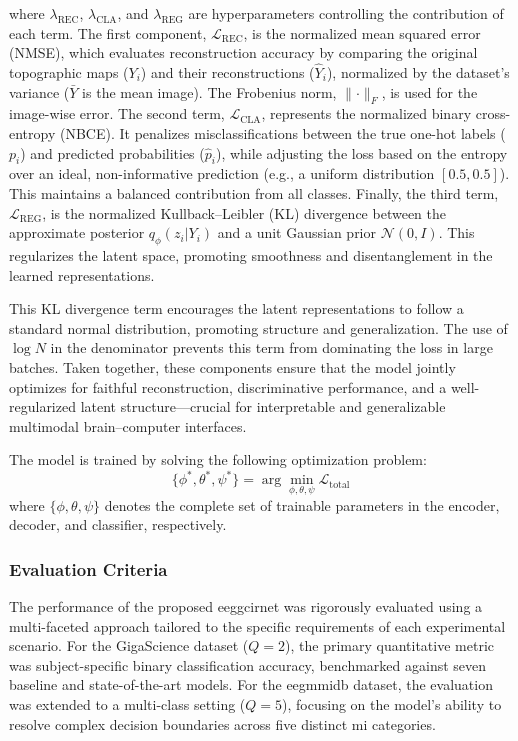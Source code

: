 \noindent
where $\lambda_{\text{REC}}$, $\lambda_{\text{CLA}}$, and $\lambda_{\text{REG}}$ are hyperparameters controlling the contribution of each term.
The first component, $\mathcal{L}_{\text{REC}}$, is the normalized mean squared error (NMSE), which evaluates reconstruction accuracy by comparing the original topographic maps ($Y_i$) and their reconstructions ($\hat{Y}_i$), normalized by the dataset's variance ($\bar{Y}$ is the mean image). The Frobenius norm, $\lVert \cdot \rVert_F$, is used for the image-wise error.
The second term, $\mathcal{L}_{\text{CLA}}$, represents the normalized binary cross-entropy (NBCE). It penalizes misclassifications between the true one-hot labels ($p_i$) and predicted probabilities ($\hat{p}_i$), while adjusting the loss based on the entropy over an ideal, non-informative prediction (e.g., a uniform distribution $[0.5, 0.5]$). This maintains a balanced contribution from all classes.
Finally, the third term, $\mathcal{L}_{\text{REG}}$, is the normalized Kullback–Leibler (KL) divergence between the approximate posterior $q_{\phi}(z_i|Y_i)$ and a unit Gaussian prior $\mathcal{N}(0, I)$. This regularizes the latent space, promoting smoothness and disentanglement in the learned representations.

This KL divergence term encourages the latent representations to follow a standard normal distribution, promoting structure and generalization. The use of $\log N$ in the denominator prevents this term from dominating the loss in large batches. Taken together, these components ensure that the model jointly optimizes for faithful reconstruction, discriminative performance, and a well-regularized latent structure—crucial for interpretable and generalizable multimodal brain–computer interfaces.

The model is trained by solving the following optimization problem:
\[
\{\phi^*, \theta^*, \psi^*\} = \arg\min_{\phi, \theta, \psi} \mathcal{L}_{\text{total}}
\]
where $\{\phi, \theta, \psi\}$ denotes the complete set of trainable parameters in the encoder, decoder, and classifier, respectively.



\subsubsection{Evaluation Criteria}

The performance of the proposed \gls{eeggcirnet} was rigorously evaluated using a multi-faceted approach tailored to the specific requirements of each experimental scenario. For the GigaScience dataset ($Q=2$), the primary quantitative metric was subject-specific binary classification accuracy, benchmarked against seven baseline and state-of-the-art models. For the \gls{eegmmidb} dataset, the evaluation was extended to a multi-class setting ($Q=5$), focusing on the model's ability to resolve complex decision boundaries across five distinct \gls{mi} categories.

